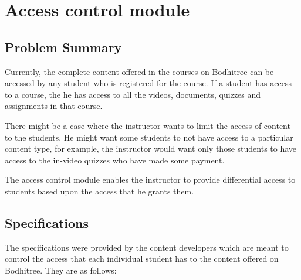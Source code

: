 \section{Access control module}

\subsection{Problem Summary}

\hspace{0.35cm} Currently, the complete content offered in the courses on Bodhitree can be accessed by any student who is registered for the course. If a student has access to a course, the he has access to all the videos, documents, quizzes and assignments in that course.
\par There might be a case where the instructor wants to limit the access of content to the students. He might want some students to not have access to a particular content type, for example, the instructor would want only those students to have access to the in-video quizzes who have made some payment.
\par The access control module enables the instructor to provide differential access to students based upon the access that he grants them.

\subsection{Specifications}

The specifications were provided by the content developers which are meant to control the access that each individual student has to the content offered on Bodhitree. They are as follows:

